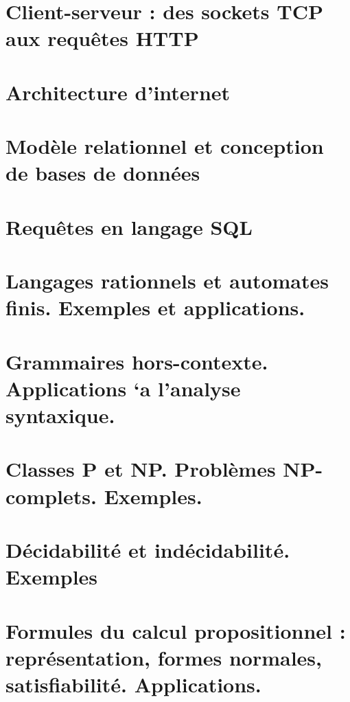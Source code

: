 \chapter{Client-serveur : des sockets TCP aux requêtes HTTP} \label{L25}


\chapter{Architecture d'internet} \label{L26}


\chapter{Modèle relationnel et conception de bases de données} \label{L27}


\chapter{Requêtes en langage SQL} \label{L28}


\chapter{Langages rationnels et automates finis. Exemples et applications.}\label{L29}


\chapter{Grammaires hors-contexte. Applications `a l’analyse syntaxique.}

\chapter{Classes P et NP. Problèmes NP-complets. Exemples.} \label{L31}


\chapter{Décidabilité et indécidabilité. Exemples} \label{L32}


\chapter{Formules du calcul propositionnel : représentation, formes normales, satisfiabilité. Applications.} \label{L33}


%
 


